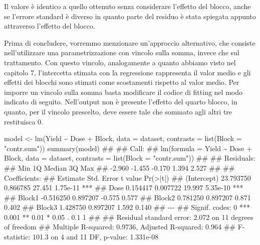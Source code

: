 \documentclass[a4paper,12pt,oneside]{book}
\newenvironment{Shaded}{\begin{snugshade}}{\end{snugshade}}
\newcommand{\SpecialCharTok}[1]{#1}
\newcommand{\StringTok}[1]{#1}
\newcommand{\DocumentationTok}[1]{#1}
\newcommand{\OtherTok}[1]{#1}
\newcommand{\FunctionTok}[1]{#1}
\newcommand{\AttributeTok}[1]{#1}
\newcommand{\NormalTok}[1]{#1}
\begin{document}
Il valore è identico a quello ottenuto senza considerare l'effetto del blocco, anche se l'errore standard è diverso in quanto parte del residuo è stata spiegata appunto attraverso l'effetto del blocco.

Prima di concludere, vorremmo menzionare un'approccio alternativo, che consiste nell'utilizzare una parametrizzazione con vincolo sulla somma, invece che sul trattamento. Con questo vincolo, analogamente a quanto abbiamo visto nel capitolo 7, l'intercetta stimata con la regressione rappresenta il valor medio e gli effetti dei blocchi sono stimati come scostamenti rispetto al valor medio. Per imporre un vincolo sulla somma basta modificare il codice di fitting nel modo indicato di seguito. Nell'output non è presente l'effetto del quarto blocco, in quanto, per il vincolo prescelto, deve essere tale che sommato agli altri tre restituisca 0.

\begin{Shaded}
\begin{Highlighting}[]
\NormalTok{model }\OtherTok{\textless{}{-}} \FunctionTok{lm}\NormalTok{(Yield }\SpecialCharTok{\textasciitilde{}}\NormalTok{ Dose }\SpecialCharTok{+}\NormalTok{ Block, }\AttributeTok{data =}\NormalTok{ dataset,}
            \AttributeTok{contrasts =} \FunctionTok{list}\NormalTok{(}\AttributeTok{Block =} \StringTok{"contr.sum"}\NormalTok{))}
\FunctionTok{summary}\NormalTok{(model)}
\DocumentationTok{\#\# }
\DocumentationTok{\#\# Call:}
\DocumentationTok{\#\# lm(formula = Yield \textasciitilde{} Dose + Block, data = dataset, contrasts = list(Block = "contr.sum"))}
\DocumentationTok{\#\# }
\DocumentationTok{\#\# Residuals:}
\DocumentationTok{\#\#    Min     1Q Median     3Q    Max }
\DocumentationTok{\#\# {-}2.960 {-}1.455 {-}0.170  1.394  2.527 }
\DocumentationTok{\#\# }
\DocumentationTok{\#\# Coefficients:}
\DocumentationTok{\#\#              Estimate Std. Error t value Pr(\textgreater{}|t|)    }
\DocumentationTok{\#\# (Intercept) 23.793750   0.866785  27.451 1.75e{-}11 ***}
\DocumentationTok{\#\# Dose         0.154417   0.007722  19.997 5.35e{-}10 ***}
\DocumentationTok{\#\# Block1      {-}0.516250   0.897207  {-}0.575    0.577    }
\DocumentationTok{\#\# Block2       0.781250   0.897207   0.871    0.402    }
\DocumentationTok{\#\# Block3       1.428750   0.897207   1.592    0.140    }
\DocumentationTok{\#\# {-}{-}{-}}
\DocumentationTok{\#\# Signif. codes:  0 \textquotesingle{}***\textquotesingle{} 0.001 \textquotesingle{}**\textquotesingle{} 0.01 \textquotesingle{}*\textquotesingle{} 0.05 \textquotesingle{}.\textquotesingle{} 0.1 \textquotesingle{} \textquotesingle{} 1}
\DocumentationTok{\#\# }
\DocumentationTok{\#\# Residual standard error: 2.072 on 11 degrees of freedom}
\DocumentationTok{\#\# Multiple R{-}squared:  0.9736, Adjusted R{-}squared:  0.964 }
\DocumentationTok{\#\# F{-}statistic: 101.3 on 4 and 11 DF,  p{-}value: 1.331e{-}08}
\end{Highlighting}
\end{Shaded}
\end{document}
